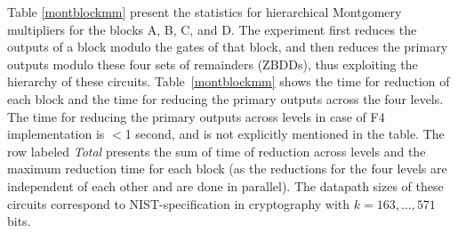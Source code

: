 
Table \ref{montblockmm} present the
statistics for hierarchical Montgomery multipliers for the blocks A,
B, C, and D. The experiment first reduces the outputs of a block
modulo the gates of that block, and then reduces the primary outputs
modulo these four sets of remainders (ZBDDs), thus exploiting the
hierarchy of these circuits. Table~\ref{montblockmm} shows the time
for reduction of each block and the time for reducing the primary
outputs across the four levels. The  time for reducing the primary
outputs across  levels in case of F4 implementation is $<$1 second,
and is not explicitly mentioned in the table. The row labeled
\textit{Total} presents the sum of time of reduction across levels and
the maximum reduction time for each block (as the reductions for the
four levels are independent of each other and are done in
parallel). The datapath sizes of these circuits correspond to
NIST-specification in cryptography with $k = 163,\dots,571$ bits.




